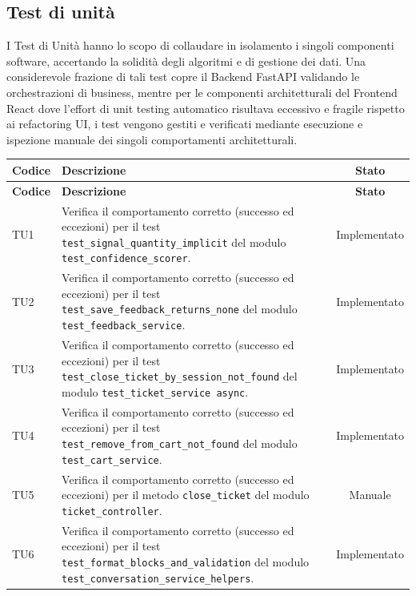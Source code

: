 \documentclass[a4paper,11pt,oneside]{scrartcl}
\begin{document}
\subsection{Test di unità}
I Test di Unità hanno lo scopo di collaudare in isolamento i singoli componenti software, accertando la solidità degli algoritmi e di gestione dei dati. Una considerevole frazione di tali test copre il Backend FastAPI validando le orchestrazioni di business, mentre per le componenti architetturali del Frontend React dove l'effort di unit testing automatico risultava eccessivo e fragile rispetto ai refactoring UI, i test vengono gestiti e verificati mediante esecuzione e ispezione manuale dei singoli comportamenti architetturali.
\begin{longtable}{|p{1.9cm}|p{11.6cm}|c|}
    \hline
    \rowcolor[gray]{0.9}
    \textbf{Codice} & \textbf{Descrizione}                                                                                                                                         & \textbf{Stato} \\
    \hline
    \endfirsthead
    \hline
    \rowcolor[gray]{0.9}
    \textbf{Codice} & \textbf{Descrizione}                                                                                                                                         & \textbf{Stato} \\
    \hline
    \endhead
        TU1 & Verifica il comportamento corretto (successo ed eccezioni) per il test \texttt{test\_signal\_quantity\_implicit} del modulo \texttt{test\_confidence\_scorer}. & Implementato \\ \hline
    TU2 & Verifica il comportamento corretto (successo ed eccezioni) per il test \texttt{test\_save\_feedback\_returns\_none} del modulo \texttt{test\_feedback\_service}. & Implementato \\ \hline
    TU3 & Verifica il comportamento corretto (successo ed eccezioni) per il test \texttt{test\_close\_ticket\_by\_session\_not\_found} del modulo \texttt{test\_ticket\_service     async}. & Implementato \\ \hline
    TU4 & Verifica il comportamento corretto (successo ed eccezioni) per il test \texttt{test\_remove\_from\_cart\_not\_found} del modulo \texttt{test\_cart\_service}. & Implementato \\ \hline
    TU5 & Verifica il comportamento corretto (successo ed eccezioni) per il metodo \texttt{close\_ticket} del modulo \texttt{ticket\_controller}. & Manuale \\ \hline
    TU6 & Verifica il comportamento corretto (successo ed eccezioni) per il test \texttt{test\_format\_blocks\_and\_validation} del modulo \texttt{test\_conversation\_service\_helpers}. & Implementato \\ \hline

\end{longtable}
\end{document}
